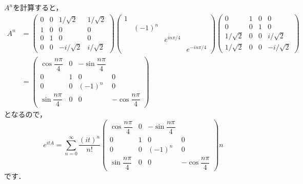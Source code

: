 \documentclass[a4paper,pdflatex,ja=standard]{bxjsarticle}
\begin{document}
\begin{enumerate}
\begin{enumerate}
    $A^n$を計算すると，
    \begin{align}
      A^n
      &=
      \begin{pmatrix}
        0 & 0 & 1/\sqrt{2} & 1/\sqrt{2} \\
        1 & 0 & 0 & 0 \\
        0 & 1 & 0 & 0 \\
        0 & 0 & -i/\sqrt{2} & i/\sqrt{2}
      \end{pmatrix}    
      \begin{pmatrix}
        1 & & & \\
          & (-1)^n & & \\
          & & e^{in\pi/4} & \\
          & & & e^{-in\pi/4}
      \end{pmatrix} 
      \begin{pmatrix}
        0 & 1 & 0 & 0 \\
        0 & 0 & 1 & 0 \\
        1/\sqrt{2} & 0 & 0 & i/\sqrt{2} \\
        1/\sqrt{2} & 0 & 0 & -i/\sqrt{2}
      \end{pmatrix}   
      \nonumber
      \\
      &=
      \begin{pmatrix}
        \cos\dfrac{n\pi}{4} & 0 & -\sin \dfrac{n\pi}{4} \\
        0 & 1 & 0 & 0 \\
        0 & 0 & (-1)^n & 0 \\
        \sin\dfrac{n\pi}{4} & 0 & 0 & -\cos\dfrac{n\pi}{4}
      \end{pmatrix}  
    \end{align}
    となるので，
    \begin{equation}
      e^{itA}
      =
      \sum_{n=0}^{\infty}
      \frac{(it)^n}{n!}
      \begin{pmatrix}
        \cos\dfrac{n\pi}{4} & 0 & -\sin \dfrac{n\pi}{4} \\
        0 & 1 & 0 & 0 \\
        0 & 0 & (-1)^n & 0 \\
        \sin\dfrac{n\pi}{4} & 0 & 0 & -\cos\dfrac{n\pi}{4}
      \end{pmatrix}  n   
    \end{equation}
    です．


  \end{enumerate}


\end{enumerate}
\end{document}

